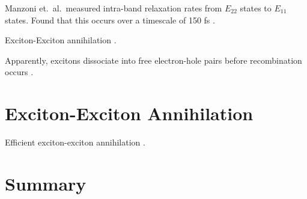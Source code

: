 Manzoni et.\ al.\ measured intra-band relaxation rates from $E_{22}$ states to $E_{11}$ states. Found that this occurs over a timescale of 150 fs \cite{manzoni2005intersubband}.

Exciton-Exciton annihilation \cite{valkunas2006exciton, yuma2013biexciton}.

Apparently, excitons dissociate into free electron-hole pairs before recombination occurs \cite{kumamoto2014spontaneous}.
\section{Exciton-Exciton Annihilation}
Efficient exciton-exciton annihilation \cite{murakami2009existence}.

\section{Summary}